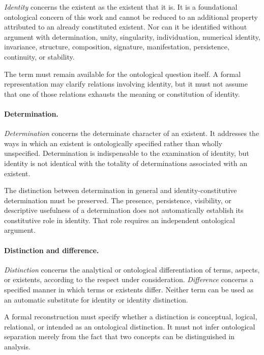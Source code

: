 \emph{Identity} concerns the existent as the existent
that it is. It is a foundational ontological concern
of this work and cannot be reduced to an additional
property attributed to an already constituted existent.
Nor can it be identified without argument with
determination, unity, singularity, individuation,
numerical identity, invariance, structure, composition,
signature, manifestation, persistence, continuity,
or stability.

The term must remain available for the ontological
question itself. A formal representation may clarify
relations involving identity, but it must not assume
that one of those relations exhausts the meaning
or constitution of identity.

\paragraph{Determination.}

\emph{Determination} concerns the determinate
character of an existent. It addresses the ways
in which an existent is ontologically specified
rather than wholly unspecified. Determination is
indispensable to the examination of identity, but
identity is not identical with the totality of
determinations associated with an existent.

The distinction between determination in general
and identity-constitutive determination must be
preserved. The presence, persistence, visibility,
or descriptive usefulness of a determination does
not automatically establish its constitutive role
in identity. That role requires an independent
ontological argument.

\paragraph{Distinction and difference.}

\emph{Distinction} concerns the analytical or
ontological differentiation of terms, aspects,
or existents, according to the respect under
consideration. \emph{Difference} concerns a
specified manner in which terms or existents
differ. Neither term can be used as an automatic
substitute for identity or identity distinction.

A formal reconstruction must specify whether a
distinction is conceptual, logical, relational,
or intended as an ontological distinction. It
must not infer ontological separation merely
from the fact that two concepts can be distinguished
in analysis.


